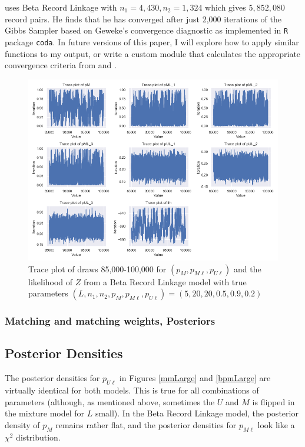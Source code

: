 \documentclass[11pt,reqno]{amsart}
\newcommand\params{(p_M, p_{M\ell}, p_{U\ell})}
\begin{document}
\cite{sadinle_2017} uses Beta Record Linkage with $n_1 = 4,430, n_2 = 1,324$ which gives $5,852,080$ record pairs.  He finds that he has converged after just 2,000 iterations of the Gibbs Sampler based on Geweke's convergence diagnostic as implemented in \texttt{R} package \texttt{coda}.  In future versions of this paper, I will explore how to apply similar functions to my output, or write a custom module that calculates the appropriate convergence criteria from \cite{brooks_gelman_1998} and  \cite{gelman_rubin_1992}.

\begin{figure}[htbp]
\begin{center}
\includegraphics[width=\textwidth]{../Figures/bpm/nM10/allTrace_nM10_L3.png}
\caption{Trace plot of draws 85,000-100,000 for $\params$ and the likelihood of $Z$ from a Beta Record Linkage model with true parameters $(L, n_1, n_2, p_M, p_{M\ell}, p_{U\ell}) = (5, 20, 20, 0.5, 0.9, 0.2)$ }
\label{bpmTrace}
\end{center}
\end{figure}

\subsubsection{Matching and matching weights, Posteriors}



\subsection{Posterior Densities}
The posterior densities for $p_{U\ell}$ in Figures \ref{mmLarge} and \ref{bpmLarge} are virtually identical for both models.  This is true for all combinations of parameters (although, as mentioned above, sometimes the $U$ and $M$ is flipped in the mixture model for $L$ small).  In the Beta Record Linkage model, the posterior density of $p_M$ remains rather flat, and the posterior densities for $p_{M\ell}$  look like a $\chi^2$ distribution. 
\end{document}

